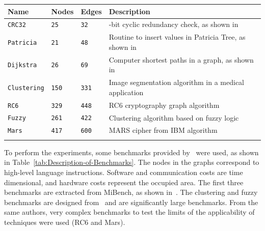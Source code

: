 \documentclass{doublecol-new}
\theoremstyle{TH}{
\newtheorem{lemma}{Lemma}
\newtheorem{theorem}[lemma]{Theorem}
\newtheorem{corrolary}[lemma]{Corrolary}
\newtheorem{conjecture}[lemma]{Conjecture}
\newtheorem{proposition}[lemma]{Proposition}
\newtheorem{claim}[lemma]{Claim}
\newtheorem{stheorem}[lemma]{Wrong Theorem}
\newtheorem{algorithm}{Algorithm}
}
\theoremstyle{THrm}{
\newtheorem{definition}{Definition}[section]
\newtheorem{question}{Question}[section]
\newtheorem{remark}{Remark}
\newtheorem{scheme}{Scheme}
}
\theoremstyle{THhit}{
\newtheorem{case}{Case}[section]
}
\begin{document}
\begin{minipage}{\linewidth}
\centering
\small
\sffamily\small
\tabulinesep=4pt
\begin{tabular}[c]{m{1.5cm}m{0.7cm}m{0.7cm}m{4.0 cm}}
\toprule[1.5pt]
\textbf{Name} & \textbf{Nodes} & \textbf{Edges} & \textbf{Description}\\
\midrule
\verb|CRC32| & \verb|25| & \verb|32| & \rmfamily 32-bit cyclic redundancy check, as shown in~\cite{Guthaus2001}\\
\hline
\verb|Patricia| & \verb|21| & \verb|48| & \rmfamily
\vspace{0.8 mm} Routine to insert values in Patricia Tree, as shown in ~\cite{Guthaus2001}\\
\hline
\verb|Dijkstra| & \verb|26| & \verb|69| & \rmfamily \vspace{0.8 mm} Computer shortest paths in a graph, as shown in~\cite{Guthaus2001}\\
\hline
\verb|Clustering| & \verb|150| & \verb|331| & \rmfamily \vspace{0.8 mm} Image segmentation algorithm in a medical application\\
\hline
\verb|RC6| & \verb|329| & \verb|448| & \rmfamily \vspace{0.8 mm} RC6 cryptography graph algorithm\\
\hline
\verb|Fuzzy| & \verb|261| & \verb|422| & \rmfamily \vspace{0.8 mm} Clustering algorithm based on fuzzy logic\\
\hline
\verb|Mars| & \verb|417| & \verb|600| & \rmfamily 
\vspace{1 mm} MARS cipher from IBM algorithm\\
\bottomrule[1.5pt]
\label{tab:Description-of-Benchmarks} 
\end{tabular}\par
\bigskip
\end{minipage}

\vspace{-3 mm}
To perform the experiments, some benchmarks provided by~\cite{Mann2007} were used, as shown in Table~\ref{tab:Description-of-Benchmarks}. The nodes in the graphs correspond to high-level language instructions. Software and communication costs are time dimensional, and hardware costs represent the occupied area. The first three benchmarks are extracted from MiBench, as shown in~\cite{Guthaus2001}. The clustering and fuzzy benchmarks are designed from~\cite{Mann2007} and are significantly large benchmarks. From the same authors, very complex benchmarks to test the limits of the applicability of techniques were used (RC$6$ and Mars).
\end{document}
